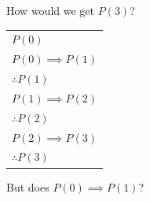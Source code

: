 \begin{frame}
  How would we get $P(3)$?

  \pause
  \begin{tabular}{l}
    $P(0)$ \\
    $P(0) \implies P(1)$ \\
    $\therefore P(1)$ \\
    $P(1) \implies P(2)$ \\
    $\therefore P(2)$ \\
    $P(2) \implies P(3)$ \\
    $\therefore P(3)$ \\
  \end{tabular}
  \pause

  But does $P(0) \implies P(1)$?

\end{frame}

